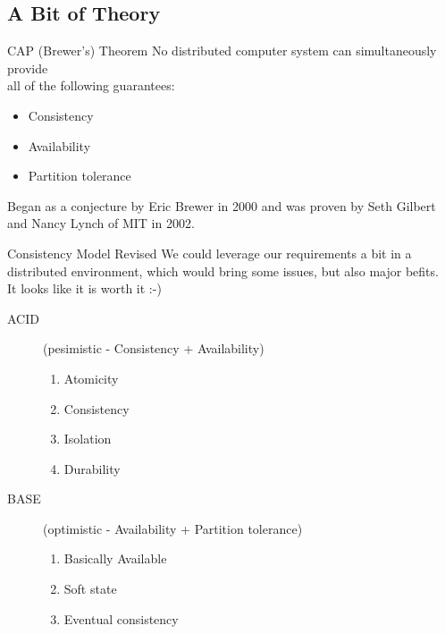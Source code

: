 \documentclass{beamer}
\begin{document}
\subsection{A Bit of Theory}
\begin{frame}{CAP (Brewer's) Theorem}
  No distributed computer system can simultaneously provide\\all of
  the following guarantees:
  \begin{itemize}
    \item Consistency
    \item Availability
    \item Partition tolerance
  \end{itemize}
  \begin{center}
  \end{center}
  \fontsize{6}{8}\selectfont
  Began as a conjecture by Eric Brewer in 2000 and was proven by Seth Gilbert
  and Nancy Lynch of MIT in 2002.\\
\end{frame}

\begin{frame}{Consistency Model Revised}
  We could leverage our requirements a bit in a distributed environment,
  which would bring some issues, but also major befits.\\
  It looks like it is worth it :-)
  \begin{description}
    \item[ACID] (pesimistic - Consistency + Availability) \hfill
    \begin{enumerate}
      \item Atomicity
      \item Consistency
      \item Isolation
      \item Durability
    \end{enumerate}
    \item[BASE] (optimistic - Availability + Partition tolerance) \hfill
    \begin{enumerate}
      \item Basically Available
      \item Soft state
      \item Eventual consistency
    \end{enumerate}
  \end{description} 
\end{frame}
\end{document}

